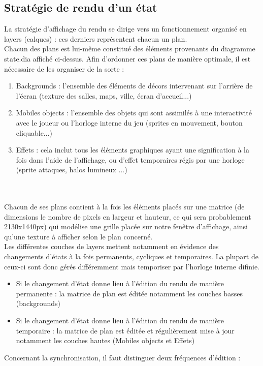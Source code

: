 \documentclass[a4paper,12pt]{article}
\begin{document}
\subsection{Stratégie de rendu d'un état}
La stratégie d'affichage du rendu se dirige vers un fonctionnement organisé en layers (calques) : ces derniers représentent chacun un plan. 
\\ \indent Chacun des plans est lui-même constitué des éléments provenants du diagramme state.dia affiché ci-dessus. Afin d'ordonner ces plans de manière optimale, il est nécessaire de les organiser de la sorte :
\begin{enumerate}
    \item Backgrounds : l'ensemble des éléments de décors intervenant sur l'arrière de l'écran (texture des salles, maps, ville, écran d'accueil...)
    \item Mobiles objects : l'ensemble des objets qui sont assimilés à une interactivité avec le joueur ou l'horloge interne du jeu (sprites en mouvement, bouton cliquable...)
    \item Effets : cela inclut tous les éléments graphiques ayant une signification à la fois dans l'aide de l'affichage, ou d'effet temporaires régis par une horloge (sprite attaques, halos lumineux ...) 
\end{enumerate}
\\
\\ \indent Chacun de ses plans contient à la fois les éléments placés sur une matrice (de dimensions le nombre de pixels en largeur et hauteur, ce qui sera probablement 2130x1440px) qui modélise une grille placée sur notre fenêtre d'affichage, ainsi qu'une texture à afficher selon le plan concerné. 
\\ \indent Les différentes couches de layers mettent notamment en évidence des changements d'états à la fois permanents, cycliques et temporaires. La plupart de ceux-ci sont donc gérés différemment mais temporiser par l'horloge interne difinie. 
\begin{itemize}
    \item Si le changement d'état donne lieu à l'édition du rendu de manière permanente : la matrice de plan est éditée notamment les couches basses (backgrounds)
    \item Si le changement d'état donne lieu à l'édition du rendu de manière temporaire : la matrice de plan est éditée et régulièrement mise à jour notamment les couches hautes (Mobiles objects et Effets)
\end{itemize}
Concernant la synchronisation, il faut distinguer deux fréquences d'édition :
\end{document}
